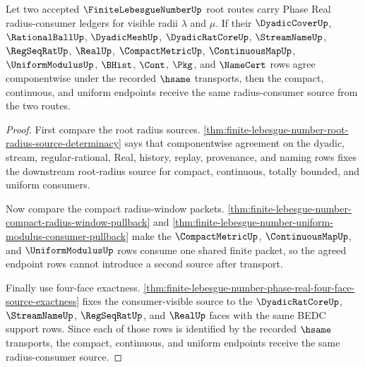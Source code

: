 \begin{theorem}
\label{thm:finite-lebesgue-number-phase-real-radius-consumer-stability}
Let two accepted $\FiniteLebesgueNumberUp$ root routes carry Phase Real radius-consumer ledgers for visible radii $\lambda$ and $\mu$. If their $\DyadicCoverUp$, $\RationalBallUp$, $\DyadicMeshUp$, $\DyadicRatCoreUp$, $\StreamNameUp$, $\RegSeqRatUp$, $\RealUp$, $\CompactMetricUp$, $\ContinuousMapUp$, $\UniformModulusUp$, $\BHist$, $\Cont$, $\Pkg$, and $\NameCert$ rows agree componentwise under the recorded $\hsame$ transports, then the compact, continuous, and uniform endpoints receive the same radius-consumer source from the two routes.
\end{theorem}
\begin{proof}
First compare the root radius sources. \autoref{thm:finite-lebesgue-number-root-radius-source-determinacy} says that componentwise agreement on the dyadic, stream, regular-rational, Real, history, replay, provenance, and naming rows fixes the downstream root-radius source for compact, continuous, totally bounded, and uniform consumers.

Now compare the compact radius-window packets. \autoref{thm:finite-lebesgue-number-compact-radius-window-pullback} and \autoref{thm:finite-lebesgue-number-uniform-modulus-consumer-pullback} make the $\CompactMetricUp$, $\ContinuousMapUp$, and $\UniformModulusUp$ rows consume one shared finite packet, so the agreed endpoint rows cannot introduce a second source after transport.

Finally use four-face exactness. \autoref{thm:finite-lebesgue-number-phase-real-four-face-source-exactness} fixes the consumer-visible source to the $\DyadicRatCoreUp$, $\StreamNameUp$, $\RegSeqRatUp$, and $\RealUp$ faces with the same BEDC support rows. Since each of those rows is identified by the recorded $\hsame$ transports, the compact, continuous, and uniform endpoints receive the same radius-consumer source.
\end{proof}

